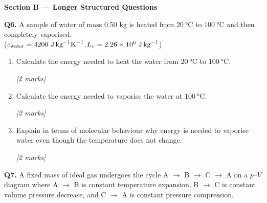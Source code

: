 \pagebreak

{\bfseries\color{midblue}\large Section B --- Longer Structured Questions}

\medskip

\begin{tcolorbox}[colback=white, colframe=midblue, breakable]

\begin{minipage}{\linewidth}
\textbf{Q6.} A sample of water of mass 0.50 kg is heated from $20\ \text{°C}$ to $100\ \text{°C}$ and then completely vaporised.\\
($c_\text{water} = 4200\ \text{J\,kg}^{-1}\text{K}^{-1}$,\quad $L_v = 2.26\times10^6\ \text{J\,kg}^{-1}$)

\begin{enumerate}[label=(\alph*)]
  \item \begin{minipage}[t]{\linewidth}
  Calculate the energy needed to heat the water from $20\ \text{°C}$ to $100\ \text{°C}$.
  \par\hfill\textit{[2 marks]}
  \vspace{3cm}
  \end{minipage}

  \item \begin{minipage}[t]{\linewidth}
  Calculate the energy needed to vaporise the water at $100\ \text{°C}$.
  \par\hfill\textit{[2 marks]}
  \vspace{3cm}
  \end{minipage}

  \item \begin{minipage}[t]{\linewidth}
  Explain in terms of molecular behaviour why energy is needed to vaporise water even though the temperature does not change.
  \par\hfill\textit{[2 marks]}
  \vspace{3.5cm}
  \end{minipage}
\end{enumerate}
\end{minipage}

\begin{minipage}{\linewidth}
\textbf{Q7.} A fixed mass of ideal gas undergoes the cycle A $\to$ B $\to$ C $\to$ A on a $p$--$V$ diagram where A $\to$ B is constant temperature expansion, B $\to$ C is constant volume pressure decrease, and C $\to$ A is constant pressure compression.


\end{minipage}
\end{tcolorbox}
